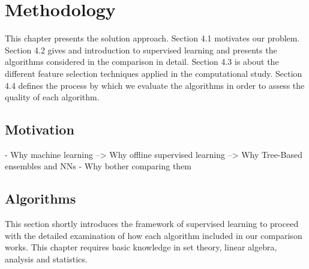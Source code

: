 \chapter{Methodology}
This chapter presents the solution approach.
Section 4.1 motivates our problem. 
Section 4.2 gives and introduction to supervised learning and presents the algorithms considered in the comparison in detail.
Section 4.3 is about the different feature selection techniques applied in the computational study. 
Section 4.4 defines the process by which we evaluate the algorithms in order to assess the quality of each algorithm.

\section{Motivation}

- Why machine learning --> Why offline supervised learning --> Why Tree-Based ensembles and NNs
- Why bother comparing them


\section{Algorithms}

This section shortly introduces the framework of supervised learning to proceed with the detailed examination of how each algorithm included in our comparison works. This chapter requires basic knowledge in set theory, linear algebra, analysis and statistics.

